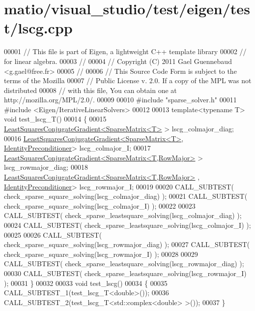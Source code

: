 \hypertarget{matio_2visual__studio_2test_2eigen_2test_2lscg_8cpp_source}{}\section{matio/visual\+\_\+studio/test/eigen/test/lscg.cpp}
\label{matio_2visual__studio_2test_2eigen_2test_2lscg_8cpp_source}

\begin{DoxyCode}
00001 \textcolor{comment}{// This file is part of Eigen, a lightweight C++ template library}
00002 \textcolor{comment}{// for linear algebra.}
00003 \textcolor{comment}{//}
00004 \textcolor{comment}{// Copyright (C) 2011 Gael Guennebaud <g.gael@free.fr>}
00005 \textcolor{comment}{//}
00006 \textcolor{comment}{// This Source Code Form is subject to the terms of the Mozilla}
00007 \textcolor{comment}{// Public License v. 2.0. If a copy of the MPL was not distributed}
00008 \textcolor{comment}{// with this file, You can obtain one at http://mozilla.org/MPL/2.0/.}
00009 
00010 \textcolor{preprocessor}{#include "sparse\_solver.h"}
00011 \textcolor{preprocessor}{#include <Eigen/IterativeLinearSolvers>}
00012 
00013 \textcolor{keyword}{template}<\textcolor{keyword}{typename} T> \textcolor{keywordtype}{void} test\_lscg\_T()
00014 \{
00015   \hyperlink{group___iterative_linear_solvers___module_class_eigen_1_1_least_squares_conjugate_gradient}{LeastSquaresConjugateGradient<SparseMatrix<T>} > 
      lscg\_colmajor\_diag;
00016   \hyperlink{group___iterative_linear_solvers___module_class_eigen_1_1_least_squares_conjugate_gradient}{LeastSquaresConjugateGradient<SparseMatrix<T>}, 
      \hyperlink{group___iterative_linear_solvers___module_class_eigen_1_1_identity_preconditioner}{IdentityPreconditioner}> lscg\_colmajor\_I;
00017   \hyperlink{group___iterative_linear_solvers___module_class_eigen_1_1_least_squares_conjugate_gradient}{LeastSquaresConjugateGradient<SparseMatrix<T,RowMajor>}
       > lscg\_rowmajor\_diag;
00018   \hyperlink{group___iterative_linear_solvers___module_class_eigen_1_1_least_squares_conjugate_gradient}{LeastSquaresConjugateGradient<SparseMatrix<T,RowMajor>}
      , \hyperlink{group___iterative_linear_solvers___module_class_eigen_1_1_identity_preconditioner}{IdentityPreconditioner}> lscg\_rowmajor\_I;
00019 
00020   CALL\_SUBTEST( check\_sparse\_square\_solving(lscg\_colmajor\_diag)  );
00021   CALL\_SUBTEST( check\_sparse\_square\_solving(lscg\_colmajor\_I)     );
00022   
00023   CALL\_SUBTEST( check\_sparse\_leastsquare\_solving(lscg\_colmajor\_diag)  );
00024   CALL\_SUBTEST( check\_sparse\_leastsquare\_solving(lscg\_colmajor\_I)     );
00025 
00026   CALL\_SUBTEST( check\_sparse\_square\_solving(lscg\_rowmajor\_diag)  );
00027   CALL\_SUBTEST( check\_sparse\_square\_solving(lscg\_rowmajor\_I)     );
00028 
00029   CALL\_SUBTEST( check\_sparse\_leastsquare\_solving(lscg\_rowmajor\_diag)  );
00030   CALL\_SUBTEST( check\_sparse\_leastsquare\_solving(lscg\_rowmajor\_I)     );
00031 \}
00032 
00033 \textcolor{keywordtype}{void} test\_lscg()
00034 \{
00035   CALL\_SUBTEST\_1(test\_lscg\_T<double>());
00036   CALL\_SUBTEST\_2(test\_lscg\_T<std::complex<double> >());
00037 \}
\end{DoxyCode}
